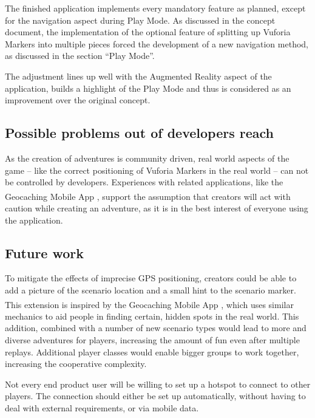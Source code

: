 \documentclass{sigchi-ext}
\begin{document}
The finished application implements every mandatory feature as planned, except for the navigation aspect during Play Mode. As discussed in the concept document, the implementation of the optional feature of splitting up Vuforia Markers into multiple pieces forced the development of a new navigation method, as discussed in the section ``Play Mode''. 

The adjustment lines up well with the Augmented Reality aspect of the application, builds a highlight of the Play Mode and thus is considered as an improvement over the original concept.

\subsection{Possible problems out of developers reach}

As the creation of adventures is community driven, real world aspects of the game -- like the correct positioning of Vuforia Markers in the real world -- can not be controlled by developers. Experiences with related applications, like the Geocaching\textsuperscript{\textregistered} Mobile App \cite{app:geocaching}, support the assumption that creators will act with caution while creating an adventure, as it is in the best interest of everyone using the application.

\subsection{Future work}

To mitigate the effects of imprecise GPS positioning, creators could be able to add a picture of the scenario location and a small hint to the scenario marker. This extension is inspired by the Geocaching\textsuperscript{\textregistered} Mobile App \cite{app:geocaching}, which uses similar mechanics to aid people in finding certain, hidden spots in the real world. This addition, combined with a number of new scenario types would lead to more and diverse adventures for players, increasing the amount of fun even after multiple replays. Additional player classes would enable bigger groups to work together, increasing the cooperative complexity.

Not every end product user will be willing to set up a hotspot to connect to other players. The connection should either be set up automatically, without having to deal with external requirements, or via mobile data.

\balance{} 



\end{document}
